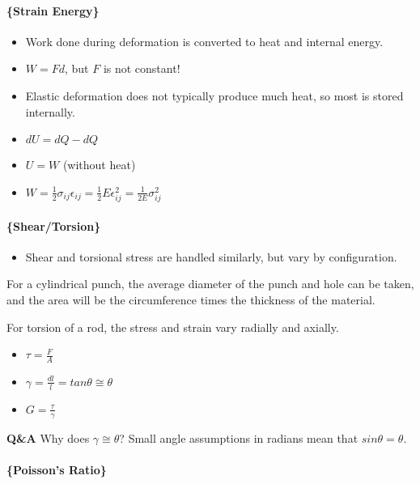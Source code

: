 \documentclass[
]{article}
\providecommand{\tightlist}{%
  \setlength{\itemsep}{0pt}\setlength{\parskip}{0pt}}
\begin{document}
{}

\hypertarget{strain-energy}{%
\paragraph{\{Strain Energy\}}\label{strain-energy}}

\begin{itemize}
\tightlist
\item
  Work done during deformation is converted to heat and internal energy.
\item
  \(W = Fd\), but \(F\) is not constant!
\item
  Elastic deformation does not typically produce much heat, so most is
  stored internally.
\item
  \(dU = dQ - dQ\)
\item
  \(U = W\) (without heat)
\item
  \(W = \frac{1}{2}\sigma_{ij}\epsilon_{ij} = \frac{1}{2}E\epsilon_{ij}^{2} = \frac{1}{2E}\sigma_{ij}^{2}\)
\end{itemize}

\hypertarget{sheartorsion}{%
\paragraph{\{Shear/Torsion\}}\label{sheartorsion}}

\begin{itemize}
\tightlist
\item
  Shear and torsional stress are handled similarly, but vary by
  configuration.
\end{itemize}

{For a cylindrical punch, the average diameter of the punch and hole can
be taken, and the area will be the circumference times the thickness of
the material.}

{For torsion of a rod, the stress and strain vary radially and axially.}

\begin{itemize}
\tightlist
\item
  \(\tau = \frac{F}{A}\)
\item
  \(\gamma = \frac{dl}{l} = tan\theta \cong \theta\)
\item
  \(G = \frac{\tau}{\gamma}\)
\end{itemize}

\textbf{Q\&A} Why does \(\gamma \cong \theta\)? Small angle assumptions
in radians mean that \(sin\theta = \theta\).

\hypertarget{poissons-ratio}{%
\paragraph{\{Poisson's Ratio\}}\label{poissons-ratio}}
\end{document}
